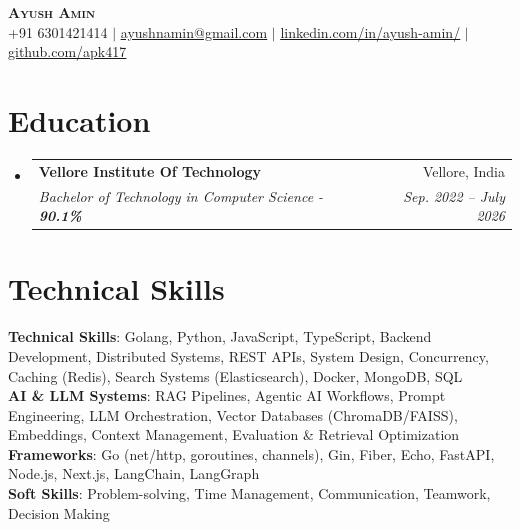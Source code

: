 \documentclass[letterpaper,11pt]{article}
\makeatletter
\newcommand{\resumeSubheading}[4]{
  \vspace{-2pt}\item
    \begin{tabular*}{0.97\textwidth}[t]{l@{\extracolsep{\fill}}r}
      \textbf{#1} & #2 \\
      \textit{\small#3} & \textit{\small #4} \\
    \end{tabular*}\vspace{-7pt}
}
\newcommand{\resumeSubHeadingListStart}{\begin{itemize}[leftmargin=0.15in, label={}]}
\newcommand{\resumeSubHeadingListEnd}{\end{itemize}}
\makeatother
\begin{document}

\begin{center}
    \textbf{\Huge \scshape Ayush Amin} \\ \vspace{1pt}
    \small +91 6301421414 $|$ \href{mailto:ayushnamin@gmail.com}{\underline{ayushnamin@gmail.com}} $|$ 
    \href{https://www.linkedin.com/in/ayush-amin/}{\underline{linkedin.com/in/ayush-amin/}} $|$
    \href{https://github.com/apk471}{\underline{github.com/apk417}}
\end{center}


\section{Education}
  \resumeSubHeadingListStart
    \resumeSubheading
      {Vellore Institute Of Technology}{Vellore, India}
      {Bachelor of Technology in Computer Science - \textbf{90.1\%}}{Sep. 2022 -- July 2026}    
  \resumeSubHeadingListEnd

\section{Technical Skills}
 \begin{itemize}[leftmargin=0.15in, label={}]
    \small{\item{
     \textbf{Technical Skills}{: Golang, Python, JavaScript, TypeScript, Backend Development, Distributed Systems, REST APIs, System Design, Concurrency, Caching (Redis), Search Systems (Elasticsearch), Docker, MongoDB, SQL} \\
     
     \textbf{AI \& LLM Systems}{: RAG Pipelines, Agentic AI Workflows, Prompt Engineering, LLM Orchestration, Vector Databases (ChromaDB/FAISS), Embeddings, Context Management, Evaluation \& Retrieval Optimization} \\
     
     \textbf{Frameworks}{: Go (net/http, goroutines, channels), Gin, Fiber, Echo, FastAPI, Node.js, Next.js, LangChain, LangGraph} \\
     
     
     \textbf{Soft Skills}{: Problem-solving, Time Management, Communication, Teamwork, Decision Making}
    }}
    \end{itemize}
\end{document}
